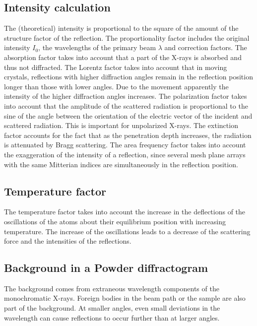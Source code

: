 \subsection{Intensity calculation}
The (theoretical) intensity is proportional to the square of the amount of the structure factor of the reflection. The proportionality factor includes the original intensity $I_0$, the wavelengths of the primary beam $\lambda$ and correction factors. The absorption factor takes into account that a part of the X-rays is absorbed and thus not diffracted. The Lorentz factor takes into account that in moving crystals, reflections with higher diffraction angles remain in the reflection position longer than those with lower angles. Due to the movement apparently the intensity of the higher diffraction angles increases. The polarization factor takes into account that the amplitude of the scattered radiation is proportional to the sine of the angle between the orientation of the electric vector of the incident and scattered radiation. This is important for unpolarized X-rays. The extinction factor accounts for the fact that as the penetration depth increases, the radiation is attenuated by Bragg scattering. The area frequency factor takes into account the exaggeration of the intensity of a reflection, since several mesh plane arrays with the same Mitterian indices are simultaneously in the reflection position. 

\subsection{Temperature factor}
The temperature factor takes into account the increase in the deflections of the oscillations of the atoms about their equilibrium position with increasing temperature. The increase of the oscillations leads to a decrease of the scattering force and the intensities of the reflections.

\subsection{ Background in a Powder diffractogram}
The background comes from extraneous wavelength components of the monochromatic X-rays. Foreign bodies in the beam path or the sample are also part of the background. At smaller angles, even small deviations in the wavelength can cause reflections to occur further than at larger angles.
